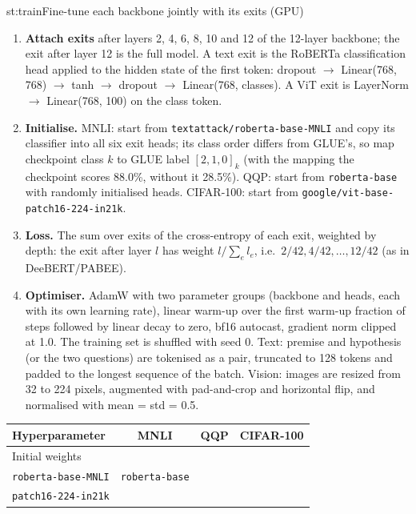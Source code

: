 \begin{step}{st:train}{Fine-tune each backbone jointly with its exits (GPU)}
\begin{enumerate}
  \item \textbf{Attach exits} after layers 2, 4, 6, 8, 10 and 12 of the 12-layer backbone; the exit after layer 12
  is the full model. A text exit is the RoBERTa classification head applied to the hidden state of the first token:
  dropout $\to$ Linear(768, 768) $\to$ tanh $\to$ dropout $\to$ Linear(768, classes). A ViT exit is LayerNorm
  $\to$ Linear(768, 100) on the class token.
  \item \textbf{Initialise.} MNLI: start from \texttt{textattack/roberta-base-MNLI} and copy its classifier into all
  six exit heads; its class order differs from GLUE's, so map checkpoint class $k$ to GLUE label $[2,1,0]_k$ (with
  the mapping the checkpoint scores 88.0\%, without it 28.5\%). QQP: start from \texttt{roberta-base} with randomly
  initialised heads. CIFAR-100: start from \texttt{google/vit-base-patch16-224-in21k}.
  \item \textbf{Loss.} The sum over exits of the cross-entropy of each exit, weighted by depth: the exit after layer
  $l$ has weight $l/\sum_{e} l_e$, i.e.\ $2/42, 4/42, \dots, 12/42$ (as in DeeBERT/PABEE).
  \item \textbf{Optimiser.} AdamW with two parameter groups (backbone and heads, each with its own learning rate),
  linear warm-up over the first warm-up fraction of steps followed by linear decay to zero, bf16 autocast, gradient
  norm clipped at 1.0. The training set is shuffled with seed 0. Text: premise and hypothesis (or the two questions)
  are tokenised as a pair, truncated to 128 tokens and padded to the longest sequence of the batch. Vision: images are
  resized from 32 to 224 pixels, augmented with pad-and-crop and horizontal flip, and normalised with mean = std = 0.5.
\end{enumerate}
\begin{center}\small
\begin{tabular}{@{}lccc@{}}
  \toprule
  Hyperparameter & MNLI & QQP & CIFAR-100 \\
  \midrule
  Initial weights & \makecell{\texttt{textattack/}\\\texttt{roberta-base-MNLI}} & \texttt{roberta-base} & \makecell{\texttt{google/vit-base-}\\\texttt{patch16-224-in21k}} \\

\end{tabular}
\end{center}
\end{step}
